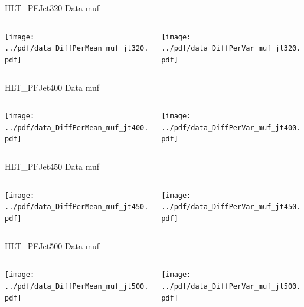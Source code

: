 \documentclass[9pt]{beamer}
\begin{document}
\begin{frame}[t]{HLT\_PFJet320 Data muf}
\begin{columns}[T]
  \begin{column}{.5\textwidth}
  \texttt{[image: ../pdf/data\_DiffPerMean\_muf\_jt320.pdf]}
  \end{column}
  \begin{column}{.5\textwidth}
  \texttt{[image: ../pdf/data\_DiffPerVar\_muf\_jt320.pdf]}
  \end{column}
\end{columns}
\end{frame}

\begin{frame}[t]{HLT\_PFJet400 Data muf}
\begin{columns}[T]
  \begin{column}{.5\textwidth}
  \texttt{[image: ../pdf/data\_DiffPerMean\_muf\_jt400.pdf]}
  \end{column}
  \begin{column}{.5\textwidth}
  \texttt{[image: ../pdf/data\_DiffPerVar\_muf\_jt400.pdf]}
  \end{column}
\end{columns}
\end{frame}

\begin{frame}[t]{HLT\_PFJet450 Data muf}
\begin{columns}[T]
  \begin{column}{.5\textwidth}
  \texttt{[image: ../pdf/data\_DiffPerMean\_muf\_jt450.pdf]}
  \end{column}
  \begin{column}{.5\textwidth}
  \texttt{[image: ../pdf/data\_DiffPerVar\_muf\_jt450.pdf]}
  \end{column}
\end{columns}
\end{frame}

\begin{frame}[t]{HLT\_PFJet500 Data muf}
\begin{columns}[T]
  \begin{column}{.5\textwidth}
  \texttt{[image: ../pdf/data\_DiffPerMean\_muf\_jt500.pdf]}
  \end{column}
  \begin{column}{.5\textwidth}
  \texttt{[image: ../pdf/data\_DiffPerVar\_muf\_jt500.pdf]}
  \end{column}
\end{columns}
\end{frame}
\end{document}
